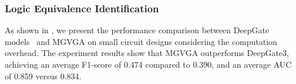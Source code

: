 \begin{table*}[]
\caption{Performance of DeepGate models and MGVGA on logic equivalence identification.}
\centering
\setlength\tabcolsep{6.4pt}
\label{table:small_logiceq}
\end{table*}

\subsubsection{Logic Equivalence Identification}
\label{sec:ext_logiceq}

As shown in , we present the performance comparison between DeepGate models~\citep{shi2023deepgate2,shi2024deepgate3} and MGVGA on small circuit designs considering the computation overhead. 
The experiment results show that MGVGA outperforms DeepGate3, achieving an average F1-score of 0.474 compared to 0.390, and an average AUC of 0.859 versus 0.834. 

